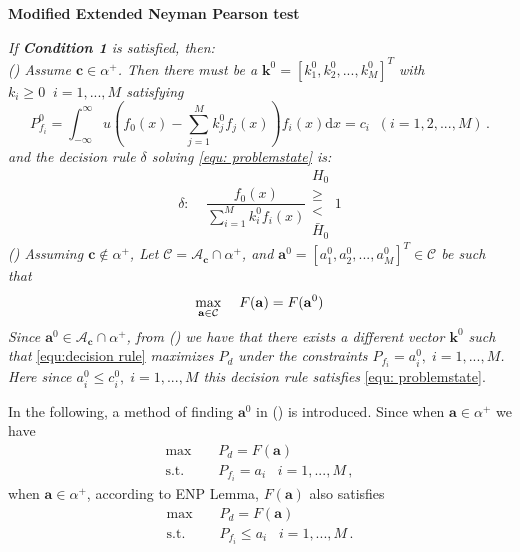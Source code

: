 \documentclass[12pt,journal,a4paper,twoside,doublecolumn]{IEEEtran}
\newcommand{\rmnum}[1]{\romannumeral #1}
\begin{document}
\begin{spacing}{1.0}
\noindent \textbf{Modified Extended Neyman Pearson test}

\noindent \textit{
If \textnormal{\textbf{Condition 1}} is satisfied, then:
\\\textnormal{(\rmnum{1})} Assume $\mathbf{c} \in \alpha^+$. Then there must be a $\mathbf{k}^0 = [k_1^0, k_2^0, ..., k_M^0]^T$ with $k_i \geq 0\;\;i=1, ..., M$ satisfying
}
\begin{equation}
\label{equ:Pf}
  P_{f_i}^0 = \int_{-\infty}^{\infty} u(f_0(x) - \sum_{j=1}^{M}k_j^0f_j(x))f_i(x)\mathrm{d}x = c_i \;\; (i= 1, 2, ..., M)\,.
\end{equation}
\textit{
and the decision rule $\delta $ solving  \eqref{equ: problemstate} is:
}
\begin{equation}
\label{equ:decision rule}
\delta:\;\;\;\;\frac{f_0(x)}{\sum_{i=1}^{M}k_i^0f_i(x)} \substack{H_0 \\ \geq \\ < \\ \bar{H}_0} 1
\end{equation}
\textit{
\noindent \textnormal{(\rmnum{2})} Assuming $\mathbf{c} \notin \alpha^+$, Let $\mathcal{C} = \mathcal{A}_{\mathbf{c}} \cap \alpha^+$, and $\mathbf{a}^0 = [a_1^0, a_2^0, ..., a_M^0]^T \in \mathcal{C}$ be such that
}
\begin{equation}
\label{equ: F0}
\max_{\mathbf{a} \in \mathcal{C}}\;\;\;\;F(\mathbf{a}) = F(\mathbf{a}^0)\\
\end{equation}
\textit{
Since $\mathbf{a}^0 \in \mathcal{A}_{\mathbf{c}} \cap \alpha^+$, from \textnormal{(\rmnum{1})} we have that there exists a different vector $\mathbf{k}^0$ such that}  \eqref{equ:decision rule} \textit{ maximizes $P_d$ under the constraints $P_{f_i} = a_i^0, \;i=1, ..., M$. Here since $a_i^0 \leq c_i^0, \;i=1, ..., M$ this decision rule  satisfies} \eqref{equ: problemstate}.

In the following, a method of finding $\mathbf{a}^0$ in (\rmnum{2}) is introduced. 
Since when $\mathbf{a} \in \alpha^+$ we have 
\begin{equation}
  \begin{split}
    \max\;\;\;\;&P_d = F(\mathbf{a})\\
    \text{s.t.}\;\;\;\;&P_{f_i} = a_i\;\;\;i=1, ..., M\,,
  \end{split}
\end{equation}
when $\mathbf{a} \in \alpha^+$, according to ENP Lemma, $F(\mathbf{a})$ also satisfies
\begin{equation}
  \begin{split}
  \label{equ: F}
        \max\;\;\;\;&P_d = F(\mathbf{a})\\
    \text{s.t.}\;\;\;\;&P_{f_i} \leq a_i\;\;\;i=1, ..., M\,.
  \end{split}
\end{equation}


\end{spacing}
\end{document}

